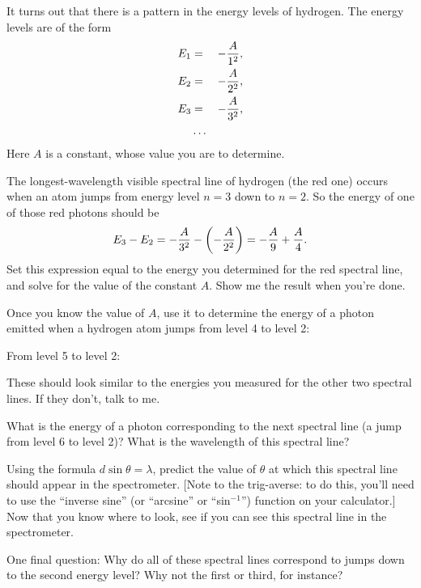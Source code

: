 It turns out that there is a pattern in the energy levels of hydrogen.
The energy levels are of the form
\begin{eqnarray*}
E_1&=&-{A\over 1^2},\\
E_2&=&-{A\over 2^2},\\
E_3&=&-{A\over 3^2},\\
&\ldots&
\end{eqnarray*}
Here $A$ is a constant, whose value you are to determine.

The longest-wavelength visible spectral line of hydrogen
(the red one) occurs when an atom jumps from energy level $n=3$
down to $n=2$.  So the energy of one of those red photons should be
$$
E_3-E_2=-{A\over 3^2}-\left(-{A\over 2^2}\right)=-{A\over 9}+{A\over 4}.
$$
Set this expression equal to the energy you determined for the red spectral
line, and solve for the value of the constant $A$.  Show me the
result when you're done.

\answerspace{2.5in}

Once you know the value of $A$, use it to determine the energy of a photon
emitted when a hydrogen atom jumps from level 4 to level 2:

\answerspace{1in}

From level 5 to level 2:

\answerspace{1in}

These should look similar to the energies you measured for the other
two spectral lines.  If they don't, talk to me.

What is the energy of a photon corresponding to the next spectral line
(a jump from level 6 to level 2)?  What is the wavelength of 
this spectral line?

\answerspace{1.5in}

Using the formula $d\sin\theta=\lambda$, predict the value of $\theta$
at which this spectral line should appear in the spectrometer.
[Note to the trig-averse: to do this, you'll need to use the ``inverse
sine'' (or ``arcsine'' or ``sin$^{-1}$'') function on your calculator.]
Now that you know where to look, see if you can see this spectral line
in the spectrometer.

\answerspace{1in}

One final question: Why do all of these spectral lines correspond
to jumps down to the second energy level?  Why not the first or third,
for instance?


